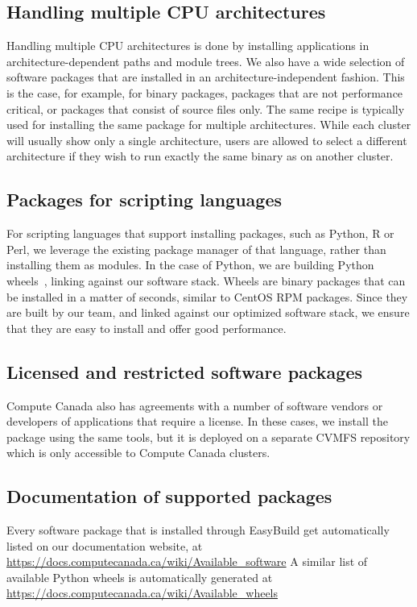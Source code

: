 \documentclass[sigconf]{acmart}
\begin{document}
\subsection{Handling multiple CPU architectures}
\label{sub:Handling_multiple_CPU_architectures}
Handling multiple CPU architectures is done by installing applications in architecture-dependent paths and module trees. We also have a wide selection of software packages that are installed in an architecture-independent fashion. This is the case, for example, for binary packages, packages that are not performance critical, or packages that consist of source files only. The same recipe is typically used for installing the same package for multiple architectures. While each cluster will usually show only a single architecture, users are allowed to select a different architecture if they wish to run exactly the same binary as on another cluster.

\subsection{Packages for scripting languages}
\label{sub:Packages_for_scripting_languages}
For scripting languages that support installing packages, such as Python, R or Perl, we leverage the existing package manager of that language, rather than installing them as modules. In the case of Python, we are building Python wheels~\cite{Wheels}, linking against our software stack. Wheels are binary packages that can be installed in a matter of seconds, similar to CentOS RPM packages. Since they are built by our team, and linked against our optimized software stack, we ensure that they are easy to install and offer good performance.

\subsection{Licensed and restricted software packages}
\label{sub:Licensed_software_packages}
Compute Canada also has agreements with a number of software vendors or developers of applications that require a license. In these cases, we install the package using the same tools, but it is deployed on a separate CVMFS repository which is only accessible to Compute Canada clusters.

\subsection{Documentation of supported packages}
\label{sub:Documentation}
Every software package that is installed through EasyBuild get automatically listed on our documentation website, at \\
\url{https://docs.computecanada.ca/wiki/Available_software}
A similar list of available Python wheels is automatically generated at \\
\url{https://docs.computecanada.ca/wiki/Available_wheels}
\end{document}
